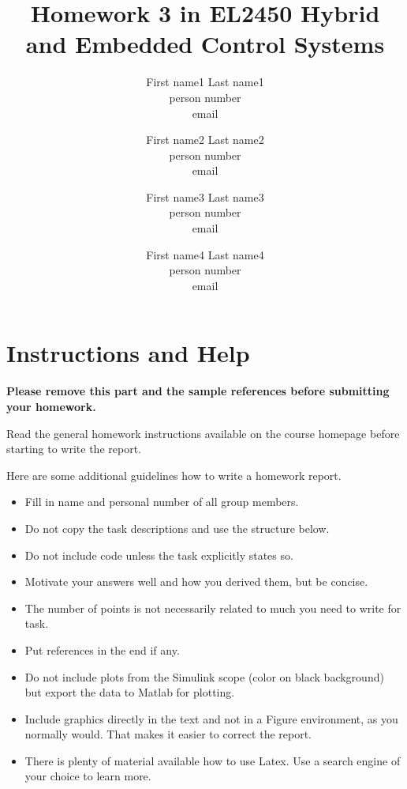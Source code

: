 \documentclass[a4paper,12pt,oneside,onecolumn]{article} %
\begin{document}

\title{Homework 3 in EL2450 Hybrid and Embedded Control Systems}
\author{
  First name1 Last name1 \\ person number \\ email
  \and
  First name2 Last name2 \\ person number \\ email
  \and
  First name3 Last name3 \\ person number \\ email
  \and
  First name4 Last name4 \\ person number \\ email
  \and
  }

\maketitle                     %





\section*{Instructions and Help}

\textbf{Please remove this part and the sample references before submitting your homework.}

Read the general homework instructions available on the course homepage before starting to write the report.

Here are some additional guidelines how to write a homework report.
\begin{itemize}
 \item Fill in name and personal number of all group members.
 \item Do not copy the task descriptions and use the structure below.
 \item Do not include code unless the task explicitly states so.
 \item Motivate your answers well and how you derived them, but be concise.
 \item The number of points is not necessarily related to much you need to write for task.
 \item Put references in the end if any.
 \item Do not include plots from the Simulink scope (color on black background) but export the data to Matlab for plotting.
 \item Include graphics directly in the text and not in a Figure environment, as you normally would. That makes it easier to correct the report.
 \item There is plenty of material available how to use Latex. Use a search engine of your choice to learn more.
\end{itemize}
\end{document}
